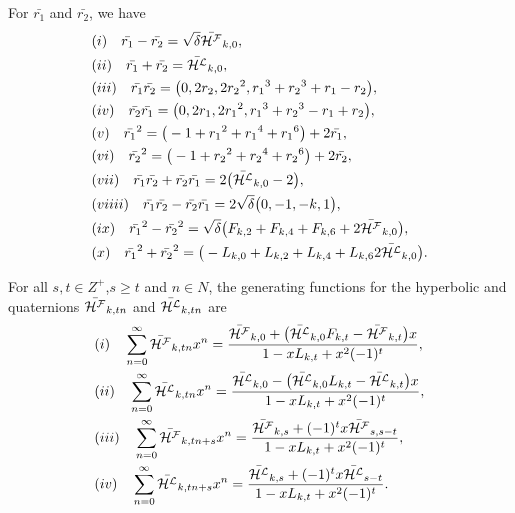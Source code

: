\begin{lemma}\label{2.4l}
For $\bar{r_1}$ and $\bar{r_2}$, we have
\begin{align*}
&(i)\quad\bar{r_1}-\bar{r_2}=\sqrt{\delta}\bar{{\mathcal{H^F}}}_{k,0},\\ 
&(ii)\quad\bar{r_1}+\bar{r_2}=\bar{{\mathcal{H^L}}}_{k,0},\\
&(iii)\quad\bar{r_1}\bar{r_2}=\big(0, 2r_2, 2{r_2}^2, {r_1}^3+{r_2}^3+r_1-r_2\big),\\
&(iv)\quad\bar{r_2}\bar{r_1}=\big(0, 2r_1, 2{r_1}^2, {r_1}^3+{r_2}^3-r_1+r_2\big),\\
&(v)\quad{\bar{r_1}}^2=\big(-1+{r_1}^2+{r_1}^4+{r_1}^6\big)+2\bar{r_1},\\
&(vi)\quad{\bar{r_2}}^2=\big(-1+{r_2}^2+{r_2}^4+{r_2}^6\big)+2\bar{r_2},\\
&(vii)\quad\bar{r_1}\bar{r_2}+\bar{r_2}\bar{r_1}=2\big(\bar{{\mathcal{H^L}}}_{k,0}-2\big),\\
&(viiii)\quad\bar{r_1}\bar{r_2}-\bar{r_2}\bar{r_1}=2\sqrt{\delta}\big(0, -1, -k, 1\big),\\
&(ix)\quad{\bar{r_1}}^2-{\bar{r_2}}^2=\sqrt{\delta}\big(F_{k,2}+F_{k,4}+F_{k,6}+2\bar{{\mathcal{H^F}}}_{k,0}\big),\\
&(x)\quad{\bar{r_1}}^2+{\bar{r_2}}^2=\big(-L_{k,0}+L_{k,2}+L_{k,4}+L_{k,6}2\bar{{\mathcal{H^L}}}_{k,0}\big).
\end{align*}
\end{lemma}
\begin{theorem}\label{2.5t}
For all $s, t\in Z^+$,$s\geq t$ and $n\in N$, the generating functions for the hyperbolic \kF\vspace{.5mm} and \kL\vspace{.5mm} quaternions $\bar{{\mathcal{H^F}}}_{k,tn}$ and $\bar{{\mathcal{H^L}}}_{k,tn}$ are 
\begin{align*}
&(i)\quad \sum\limits_{n=0}^{\infty}\bar{{\mathcal{H^F}}}_{k,tn}x^n=\dfrac{\bar{{\mathcal{H^F}}}_{k,0}+\big(\bar{{\mathcal{H^L}}}_{k,0}F_{k,t}-\bar{{\mathcal{H^F}}}_{k,t}\big)x}{1-xL_{k,t}+x^2(-1)^t},\\
&(ii)\quad\sum\limits_{n=0}^{\infty}\bar{{\mathcal{H^L}}}_{k,tn}x^n=\dfrac{\bar{{\mathcal{H^L}}}_{k,0}-\big(\bar{{\mathcal{H^L}}}_{k,0}L_{k,t}-\bar{{\mathcal{H^L}}}_{k,t}\big)x}{1-xL_{k,t}+x^2(-1)^t},\\
&(iii)\quad\sum\limits_{n=0}^{\infty}\bar{{\mathcal{H^F}}}_{k,tn+s}x^n=\dfrac{\bar{{\mathcal{H^F}}}_{k,s}+(-1)^tx\bar{{\mathcal{H^F}}}_{s,s-t}}{1-xL_{k,t}+x^2(-1)^t},\\
&(iv)\quad\sum\limits_{n=0}^{\infty}\bar{{\mathcal{H^L}}}_{k,tn+s}x^n=\dfrac{\bar{{\mathcal{H^L}}}_{k,s}+(-1)^tx\bar{{\mathcal{H^L}}}_{s-t}}{1-xL_{k,t}+x^2(-1)^t}.
\end{align*}
\end{theorem}
